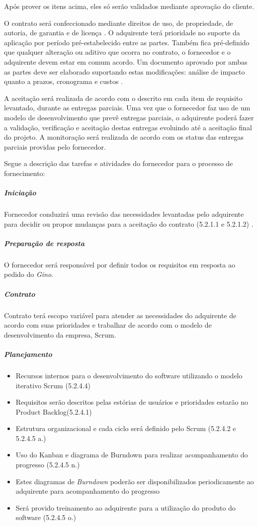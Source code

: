 Após prover os itens acima, eles só serão validados mediante aprovação do cliente.

O contrato será confeccionado mediante direitos de uso, de propriedade, de autoria, de garantia e de licença \cite{iso12207:95}. O adquirente terá prioridade no suporte da aplicação por período pré-estabelecido entre as partes. Também fica pré-definido que qualquer alteração ou aditivo que ocorra no contrato, o fornecedor e o adquirente devem estar em comum acordo. Um documento aprovado por ambas as partes deve ser elaborado suportando estas modificações: análise de impacto quanto a prazos, cronograma e custos \cite{iso12207:95}.

A aceitação será realizada de acordo com o descrito em cada item de requisito levantado, durante as entregas parciais. Uma vez que o fornecedor faz uso de um modelo de desenvolvimento que prevê entregas parciais, o adquirente poderá fazer a validação, verificação e aceitação destas entregas evoluindo até a aceitação final do projeto. A monitoração será realizada de acordo com os status das entregas parciais providas pelo fornecedor. 

Segue a descrição das tarefas e atividades do fornecedor para o processo de fornecimento:


\subparagraph{Iniciação}

Fornecedor conduzirá uma revisão das necessidades levantadas pelo adquirente para decidir ou propor mudanças para a aceitação do contrato (5.2.1.1 e 5.2.1.2) \cite{iso12207:95}.

\subparagraph{Preparação de resposta}

O fornecedor será responsável por definir todos os requisitos em resposta ao pedido do \textit{Gino}.

\subparagraph{Contrato}

Contrato terá escopo variável para atender as necessidades do adquirente de acordo com suas prioridades e trabalhar de acordo com o modelo de desenvolvimento da empresa, Scrum.

\subparagraph{Planejamento}

\begin{itemize}
  \item Recursos internos para o desenvolvimento do software utilizando o modelo iterativo Scrum (5.2.4.4)
  \item Requisitos serão descritos pelas estórias de usuários e prioridades estarão no Product Backlog(5.2.4.1)
  \item Estrutura organizacional e cada ciclo será definido pelo Scrum (5.2.4.2 e 5.2.4.5 a.)
  \item Uso do Kanban e diagrama de Burndown para realizar acompanhamento do progresso (5.2.4.5 n.)
  \item Estes diagramas de \textit{Burndown} poderão ser disponibilizados periodicamente ao adquirente para acompanhamento do progresso
  \item Será provido treinamento ao adquirente para a utilização do produto do software (5.2.4.5 o.)
\end{itemize}

